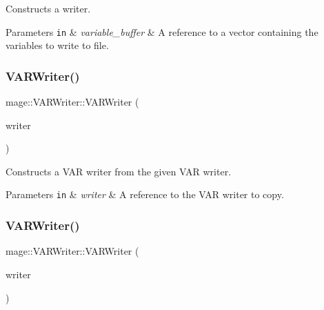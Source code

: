 Constructs a writer.


\begin{DoxyParams}[1]{Parameters}
\mbox{\tt in}  & {\em variable\+\_\+buffer} & A reference to a vector containing the variables to write to file. \\
\hline
\end{DoxyParams}
\hypertarget{classmage_1_1_v_a_r_writer_aa5534d333e4c5d65cb52a7b0691c65ab}{}\label{classmage_1_1_v_a_r_writer_aa5534d333e4c5d65cb52a7b0691c65ab} 
\subsubsection{\texorpdfstring{V\+A\+R\+Writer()}{VARWriter()}\hspace{0.1cm}{\footnotesize\ttfamily [2/3]}}
{\footnotesize\ttfamily mage\+::\+V\+A\+R\+Writer\+::\+V\+A\+R\+Writer (\begin{DoxyParamCaption}\item[{const \hyperlink{classmage_1_1_v_a_r_writer}{V\+A\+R\+Writer} \&}]{writer }\end{DoxyParamCaption})\hspace{0.3cm}{\ttfamily [delete]}}

Constructs a V\+AR writer from the given V\+AR writer.


\begin{DoxyParams}[1]{Parameters}
\mbox{\tt in}  & {\em writer} & A reference to the V\+AR writer to copy. \\
\hline
\end{DoxyParams}
\hypertarget{classmage_1_1_v_a_r_writer_a6f9ef51a6c6c68b07de4a409a7ddeeda}{}\label{classmage_1_1_v_a_r_writer_a6f9ef51a6c6c68b07de4a409a7ddeeda} 
\subsubsection{\texorpdfstring{V\+A\+R\+Writer()}{VARWriter()}\hspace{0.1cm}{\footnotesize\ttfamily [3/3]}}
{\footnotesize\ttfamily mage\+::\+V\+A\+R\+Writer\+::\+V\+A\+R\+Writer (\begin{DoxyParamCaption}\item[{\hyperlink{classmage_1_1_v_a_r_writer}{V\+A\+R\+Writer} \&\&}]{writer }\end{DoxyParamCaption})\hspace{0.3cm}{\ttfamily [default]}}

